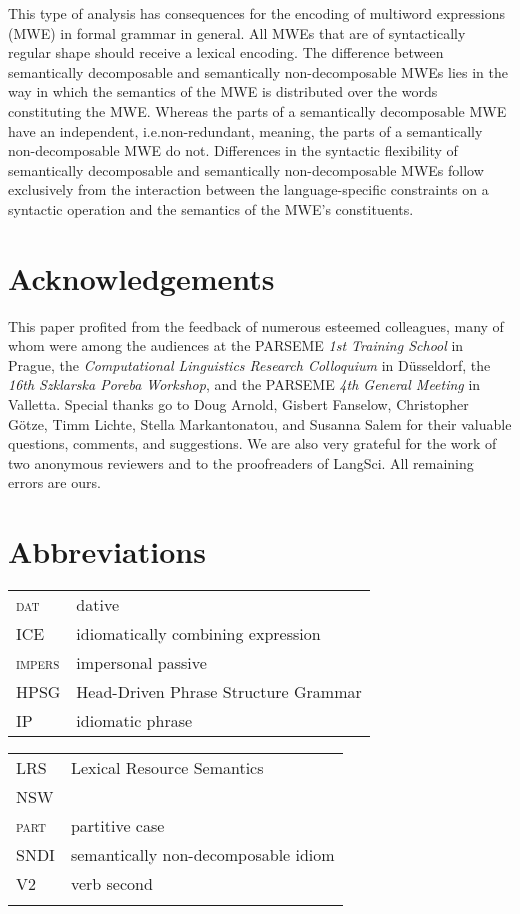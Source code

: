 \documentclass[output=paper]{langsci/langscibook}
\begin{document}
This type of analysis has consequences for the encoding of multiword expressions (MWE) in formal grammar in general. All MWEs that are of syntactically regular shape should receive a lexical encoding. The difference between  semantically decomposable and  semantically non-decomposable MWEs lies in the way in which the semantics of the MWE is distributed over the words constituting the MWE. Whereas the parts of a semantically decomposable MWE have an independent, i.e.\@ non-redundant, meaning, the parts of a semantically non-decomposable MWE do not. Differences in the syntactic flexibility of semantically decomposable and semantically non-decomposable MWEs follow exclusively from the interaction between the language-specific constraints on a syntactic operation and the semantics of the MWE's constituents.

\section*{Acknowledgements}

This paper profited from the feedback of numerous esteemed colleagues, many of whom were among the audiences at the PARSEME \emph{1st Training School} in Prague, 
the \emph{Computational Linguistics Research Colloquium} in D\"usseldorf, 
the \emph{16th Szklarska Poreba Workshop}, and the PARSEME \emph{4th General Meeting} in Valletta. Special thanks go to Doug Arnold, Gisbert Fanselow, Christopher G\"otze, Timm Lichte, Stella Markantonatou, and Susanna Salem for their valuable questions, comments, and suggestions. We are also very grateful for the work of two anonymous reviewers and to the proofreaders of LangSci. All remaining errors are ours.

\section*{Abbreviations}
 
\begin{tabularx}{.44\textwidth}{lQ}
\textsc{dat} & dative \\
ICE & idiomatically combining expression \\
\textsc{impers} & impersonal passive \\
HPSG & Head-Driven Phrase Structure Grammar \\
IP & idiomatic phrase \\
\end{tabularx}
\begin{tabularx}{.55\textwidth}{lQ}
LRS & Lexical Resource Semantics \\
NSW & \citealt{Nunberg1994} \\
\textsc{part} & partitive case\\
SNDI & semantically non-decomposable idiom \\
V2 & verb second \\
\\
\end{tabularx} 

{\sloppy
\printbibliography[heading=subbibliography,notkeyword=this]
}
\end{document}
